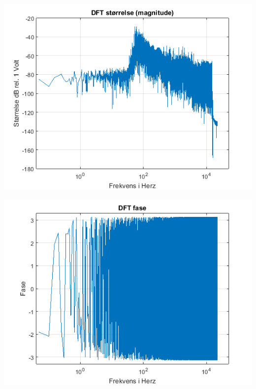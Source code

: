 \documentclass[12pt, letterpaper]{article}
\begin{document}
\begin{center}
\includegraphics[width=\textwidth]{billeder/rednexstorrelse}
\end{center}

\begin{center}
\includegraphics[width=\textwidth]{billeder/rednexfase}
\end{center}
\end{document}
